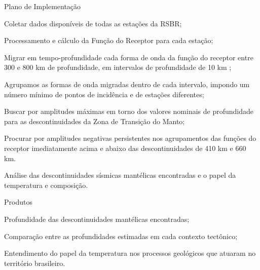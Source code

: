 \documentclass[10pt,a4paper,oneside]{book}
\begin{document}
\begin{fancyenum}{\faBrain}{Plano de Implementação}
	\item Coletar dados disponíveis de todas as estações da RSBR;
	\item Processamento e cálculo da Função do Receptor para cada estação;
	\item Migrar em tempo-profundidade cada forma de onda da função do receptor entre 300 e 800 km de profundidade, em intervalos de profundidade de 10 km ;
	\item Agrupamos as formas de onda migradas dentro de cada intervalo, impondo um número mínimo de pontos de incidência e de estações diferentes;
	\item Buscar por amplitudes máximas em torno dos valores nominais de profundidade para as descontinuidades da Zona de Transição do Manto;
	\item Procurar por amplitudes negativas persistentes nos agrupamentos das funções do receptor imediatamente acima e abaixo das descontinuidades de 410 km e 660 km. 
	\item Análise das descontinuidades sísmicas mantélicas encontradas e o papel da temperatura e composição.
\end{fancyenum}

\begin{fancyenum}{\faShoppingCart}{Produtos}
	\item Profundidade das descontinuidades mantélicas encontradas;
	\item Comparação entre as profundidades estimadas em cada contexto tectônico;	
	\item Entendimento do papel da temperatura nos processos geológicos que atuaram no território brasileiro.
\end{fancyenum}
\end{document}
